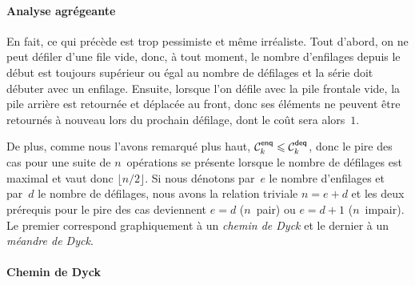 \paragraph{Analyse agrégeante}

En fait, ce qui précède est trop pessimiste et même irréaliste. Tout
d'abord, on ne peut défiler d'une file vide, donc, à tout moment, le
nombre d'enfilages depuis le début est toujours supérieur ou égal au
nombre de défilages et la série doit débuter avec un
enfilage. Ensuite, lorsque l'on défile avec la pile frontale vide, la
pile arrière est retournée et déplacée au front, donc ses éléments ne
peuvent être retournés à nouveau lors du prochain défilage, dont le
coût sera alors~\(1\).

De plus, comme nous l'avons remarqué plus haut, \(\C{\fun{enq}}{k}
\leqslant \C{\fun{deq}}{k}\), donc le pire des cas pour une suite de
\(n\)~opérations se présente lorsque le nombre de défilages est
maximal et vaut donc \(\lfloor{n/2}\rfloor\). Si nous dénotons
par~\(e\) le nombre d'enfilages et par~\(d\) le nombre de défilages,
nous avons la relation triviale \(n = e + d\) et les deux prérequis
pour le pire des cas deviennent \(e=d\) (\(n\)~pair) ou \(e=d+1\)
(\(n\)~impair). Le premier correspond graphiquement à un \emph{chemin
de Dyck} et le dernier à un \emph{méandre de
Dyck}.

\paragraph{Chemin de Dyck}

